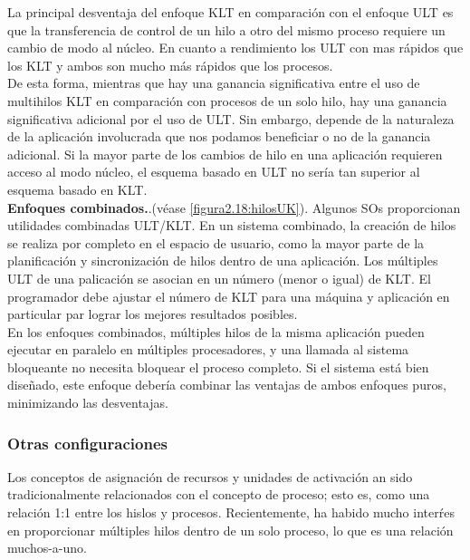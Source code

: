 \documentclass{article}
\begin{document}
					La principal desventaja del enfoque KLT en comparación con el enfoque ULT es que la transferencia de control de un hilo a otro del mismo proceso requiere un cambio de modo al núcleo. En cuanto a rendimiento los ULT con mas rápidos que los KLT y ambos son mucho más rápidos que los procesos. \\
					
					De esta forma, mientras que hay una ganancia significativa entre el uso de multihilos KLT en comparación con procesos de un solo hilo, hay una ganancia significativa adicional por el uso de ULT. Sin embargo, depende de la naturaleza de la aplicación involucrada que nos podamos beneficiar o no de la ganancia adicional. Si la mayor parte de los cambios de hilo en una aplicación requieren acceso al modo núcleo, el esquema basado en ULT no sería tan superior al esquema basado en KLT. \\
					
					\textbf{Enfoques combinados.}.(véase \ref{figura2.18:hilosUK}). Algunos SOs proporcionan utilidades combinadas ULT/KLT. En un sistema combinado, la creación de hilos se realiza por completo en el espacio de usuario, como la mayor parte de la planificación y sincronización de hilos dentro de una aplicación. Los múltiples ULT de una palicación se asocian en un número (menor o igual) de KLT. El programador debe ajustar el número de KLT para una máquina y aplicación en particular par lograr los mejores resultados posibles. \\
					
					En los enfoques combinados, múltiples hilos de la misma aplicación pueden ejecutar en paralelo en múltiples procesadores, y una llamada al sistema bloqueante no necesita bloquear el proceso completo. Si el sistema está bien diseñado, este enfoque debería combinar las ventajas de ambos enfoques puros, minimizando las desventajas.
				
				\subsubsection{Otras configuraciones}
					Los conceptos de asignación de recursos y unidades de activación an sido tradicionalmente relacionados con el concepto de proceso; esto es, como una relación 1:1 entre los hislos y procesos. Recientemente, ha habido mucho interŕes en proporcionar múltiples hilos dentro de un solo proceso, lo que es una relación muchos-a-uno. \\
					
\end{document}
